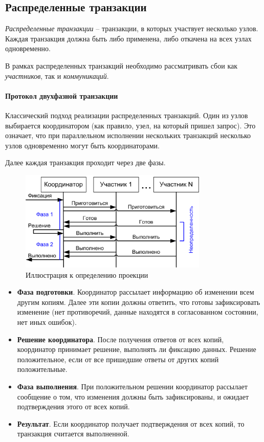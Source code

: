 \subsection{Распределенные транзакции}

\begin{definition}
	\textit{Распределенные транзакции} -- транзакции, в которых участвует несколько узлов. Каждая
	транзакция должна быть либо применена, либо откачена на всех узлах одновременно.
\end{definition}

В рамках распределенных транзакций необходимо рассматривать сбои как \textit{участников}, так и
\textit{коммуникаций}.

\paragraph{Протокол двухфазной транзакции}

Классический подход реализации распределенных транзакций. Один из узлов выбирается координатором
(как правило, узел, на который пришел запрос). Это означает, что при параллельном исполнении
нескольких транзакций несколько узлов одновременно могут быть координаторами.

Далее каждая транзакция проходит через две фазы.

\begin{figure}[h]
	\centering
	\includegraphics[width=0.8\textwidth]{../assets/kgeorgiy/distributed/Distributed_TwoPhase.png}
	\caption{Иллюстрация к определению проекции}
	\label{2-phase-tx}
\end{figure}

\begin{itemize}
	\item \textbf{Фаза подготовки}. Координатор рассылает информацию об изменении всем другим
	      копиям. Далее эти копии должны ответить, что готовы зафиксировать изменение (нет противоречий,
	      данные находятся в согласованном состоянии, нет иных ошибок).
	\item \textbf{Решение координатора}. После получения ответов от всех копий, координатор
	      принимает решение, выполнять ли фиксацию данных. Решение положительное, если от все пришедшие
	      ответы от других копий положительные.
	\item \textbf{Фаза выполнения}. При положительном решении координатор рассылает сообщение о
	      том, что изменения должны быть зафиксированы, и ожидает подтверждения этого от всех копий.
	\item \textbf{Результат}. Если координатор получает подтверждения от всех копий, то транзакция
	      считается выполненной.
\end{itemize}

